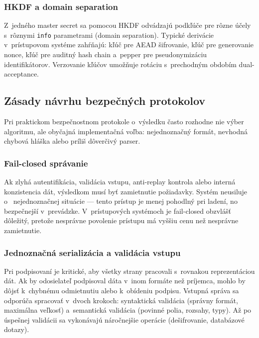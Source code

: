 \subsubsection{HKDF a domain separation}

Z~jedného master secret sa pomocou HKDF\cite{RFC5869} odvádzajú podkľúče pre rôzne účely s~rôznymi \texttt{info} parametrami (domain separation). Typické derivácie v~prístupovom systéme zahŕňajú: kľúč pre AEAD šifrovanie, kľúč pre generovanie nonce, kľúč pre auditný hash chain a~pepper pre pseudonymizáciu identifikátorov. Verzovanie kľúčov umožňuje rotáciu s~prechodným obdobím dual-acceptance\cite{NIST80057}.


\subsection{Zásady návrhu bezpečných protokolov}

Pri praktickom bezpečnostnom protokole o~výsledku často rozhodne nie výber algoritmu, ale obyčajná implementačná voľba: nejednoznačný formát, nevhodná chybová hláška alebo príliš dôverčivý parser\cite{SaltzerSchroeder1975}.

\subsubsection{Fail-closed správanie}

Ak zlyhá autentifikácia, validácia vstupu, anti-replay kontrola alebo interná konzistencia dát, výsledkom musí byť zamietnutie požiadavky\cite{NIST80053}. Systém neusiluje o~ nejednoznačnej situácie --- tento prístup je menej pohodlný pri ladení, no bezpečnejší v~prevádzke. V~prístupových systémoch je fail-closed obzvlášť dôležitý, pretože nesprávne povolenie prístupu má vyššiu cenu než nesprávne zamietnutie.

\subsubsection{Jednoznačná serializácia a validácia vstupu}

Pri podpisovaní je kritické, aby všetky strany pracovali s~rovnakou reprezentáciou dát\cite{RFC8439}. Ak by odosielateľ podpisoval dáta v~inom formáte než príjemca, mohlo by dôjsť k~chybnému odmietnutiu alebo k~obídeniu podpisu. Vstupná správa sa odporúča spracovať v~dvoch krokoch: syntaktická validácia (správny formát, maximálna veľkosť) a~semantická validácia (povinné polia, rozsahy, typy)\cite{NIST80053}. Až po úspešnej validácii sa vykonávajú náročnejšie operácie (dešifrovanie, databázové dotazy).

